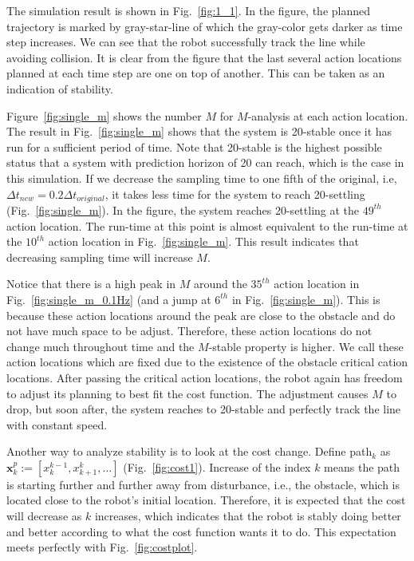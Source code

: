 \documentclass[letterpaper, 10 pt, conference]{ieeeconf}  %
\begin{document}
The simulation result is shown in Fig.~\ref{fig:1_1}. In the figure, the planned trajectory is marked by gray-star-line of which the gray-color gets darker as time step increases. We can see that the robot successfully track the line while avoiding collision. It is clear from the figure that the last several action locations planned at each time step are one on top of another. This can be taken as an indication of stability. 


Figure~\ref{fig:single_m} shows the number $M$ for $M$-analysis at each action location. The result in Fig.~\ref{fig:single_m} shows that the system is 20-stable once it has run for a sufficient period of time. Note that 20-stable is the highest possible status that a system with prediction horizon of 20 can reach, which is the case in this simulation. If we decrease the sampling time to one fifth of the original, i.e, $\Delta t_{new}=0.2\Delta t_{original}$, it takes less time for the system to reach 20-settling (Fig.~\ref{fig:single_m}). In the figure, the system reaches 20-settling at the $49^{th}$ action location. The run-time at this point is almost equivalent to the run-time at the $10^{th}$ action location in Fig.~\ref{fig:single_m}. This result indicates that decreasing sampling time will increase $M$.

Notice that there is a high peak in $M$ around the $35^{th}$ action location in Fig.~\ref{fig:single_m_0.1Hz} (and a jump at $6^{th}$ in Fig.~\ref{fig:single_m}). This is because these action locations around the peak are close to the obstacle and do not have much space to be adjust. Therefore, these action locations do not change much throughout time and the $M$-stable property is higher. We call these action locations which are fixed due to the existence of the obstacle critical cation locations. After passing the critical action locations, the robot again has freedom to adjust its planning to best fit the cost function. The adjustment causes $M$ to drop, but soon after, the system reaches to 20-stable and perfectly track the line with constant speed. 

Another way to analyze stability is to look at the cost change. Define path$_k$ as $\mathbf{x}_{k}^{p} := [x_{k}^{k-1},x_{k+1}^{k},\ldots]$ (Fig.~\ref{fig:cost1}). Increase of the index $k$ means the path is starting further and further away from disturbance, i.e., the obstacle, which is located close to the robot's initial location. Therefore, it is expected that the cost will decrease as $k$ increases, which indicates that the robot is stably doing better and better according to what the cost function wants it to do. This expectation meets perfectly with Fig.~\ref{fig:costplot}. 
\end{document}
